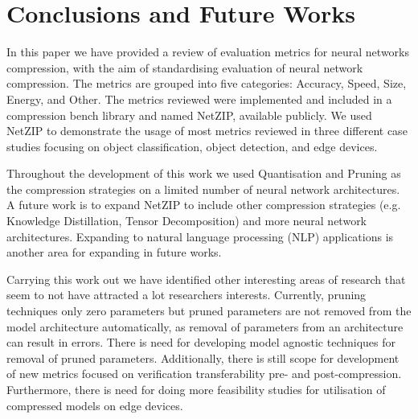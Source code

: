 

\section{Conclusions and Future Works} \label{sec:Conclusions}
In this paper we have provided a review of evaluation metrics for neural networks compression, with the aim of standardising evaluation of neural network compression.
%
The metrics are grouped into five categories: Accuracy, Speed, Size, Energy, and Other.
The metrics reviewed were implemented and included in a compression bench library and named NetZIP, available publicly.
%
We used NetZIP to demonstrate the usage of most metrics reviewed in three different case studies focusing on object classification, object detection, and edge devices.

Throughout the development of this work we used Quantisation and Pruning as the compression strategies on a limited number of neural network architectures. A future work is to expand NetZIP to include other compression strategies (e.g. Knowledge Distillation, Tensor Decomposition) and more neural network architectures.
%
Expanding to natural language processing (NLP) applications is another area for expanding in future works.

Carrying this work out we have identified other interesting areas of research that seem to not have attracted a lot researchers interests. 
%
Currently, pruning techniques only zero parameters but pruned parameters are not removed from the model architecture automatically, as removal of parameters from an architecture can result in errors.
%
There is need for developing model agnostic techniques for removal of pruned parameters.
%
Additionally, there is still scope for development of new metrics focused on  verification transferability pre- and post-compression.
%
Furthermore, there is need for doing more feasibility studies for utilisation of compressed models on edge devices. 
%
%
%



